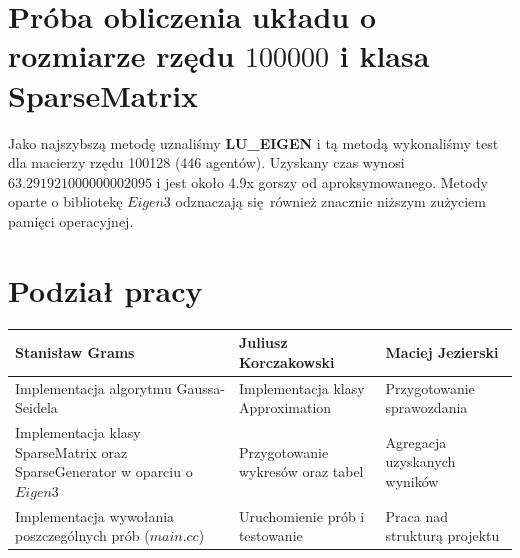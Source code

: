 \documentclass[10pt]{article}
\begin{document}
\section{Próba obliczenia układu o rozmiarze rzędu $100 000$ i klasa SparseMatrix}
	Jako najszybszą metodę uznaliśmy \textbf{LU\_EIGEN} i tą metodą wykonaliśmy test dla macierzy rzędu \num{100128} (\num{446} agentów).
	Uzyskany czas wynosi \textbf{$63.291921000000002095$} i jest około 4.9x gorszy od aproksymowanego.
	Metody oparte o bibliotekę $Eigen3$ odznaczają się również znacznie niższym zużyciem pamięci operacyjnej.

\section{Podział pracy}
\begin{center}
	\begin{tabular}{| p{6cm} | p{6cm} | p{6cm} |}
		\hline
		\textbf{Stanisław Grams} & \textbf{Juliusz Korczakowski} & \textbf{Maciej Jezierski} \\ \hline
		Implementacja algorytmu Gaussa-Seidela & Implementacja klasy Approximation & Przygotowanie sprawozdania  \\ \hline
		Implementacja klasy SparseMatrix oraz SparseGenerator w oparciu o $Eigen3$ & Przygotowanie wykresów oraz tabel & Agregacja uzyskanych wyników \\ \hline
		Implementacja wywołania poszczególnych prób ($main.cc$) & Uruchomienie prób i testowanie & Praca nad strukturą projektu\\ \hline
	\end{tabular}
\end{center}
\end{document}

